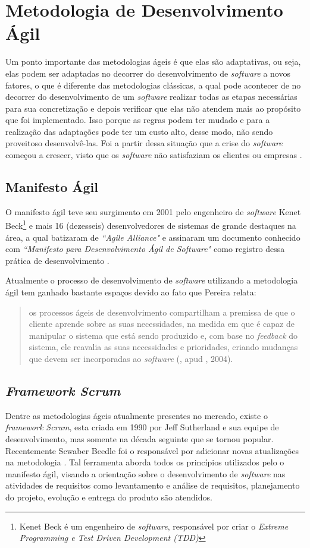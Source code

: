 \section{Metodologia de Desenvolvimento Ágil}
\noindent Um ponto importante das metodologias ágeis é que elas são adaptativas, ou seja, elas podem ser adaptadas no decorrer do desenvolvimento de \textit{software} a novos fatores, o que é diferente das metodologias clássicas, a qual pode acontecer de no decorrer do desenvolvimento de um \textit{software} realizar todas as etapas necessárias para sua concretização e depois verificar que elas não atendem mais ao propósito que foi implementado. Isso porque as regras podem ter mudado e para a realização das adaptações pode ter um custo alto, desse modo, não sendo proveitoso desenvolvê-las. Foi a partir dessa situação que a crise do \textit{software} começou a crescer, visto que os \textit{software} não satisfaziam os clientes ou empresas \cite{2005:rezende}.

\subsection{Manifesto Ágil}
\noindent O manifesto ágil teve seu surgimento em 2001 pelo engenheiro de \textit{software} Kenet Beck\footnote[5]{Kenet Beck é um engenheiro de \textit{software}, responsável por criar o \textit{Extreme Programming e Test Driven Development (TDD)}} e mais 16 (dezesseis) desenvolvedores de sistemas de grande destaques na área, a qual batizaram de \textit{``Agile Alliance"} e assinaram um documento conhecido com \textit{``Manifesto para Desenvolvimento Ágil de \textit{Software}"} como registro dessa prática de desenvolvimento \cite{2001:Pressman}.

Atualmente o processo de desenvolvimento de \textit{software} utilizando a metodologia ágil tem ganhado bastante espaços devido ao fato que Pereira \cite{2013:Pereira} relata:
\begin{quote}
    os processos ágeis de desenvolvimento compartilham a premissa de que o cliente aprende sobre as suas necessidades, na medida em que é capaz de manipular o sistema que está sendo produzido e, com base no \textit{feedback} do sistema, ele reavalia as suas necessidades e prioridades, criando mudanças que devem ser incorporadas ao \textit{software} (\cite{2013:Pereira}, apud \cite{2004:Teles}, 2004). 
\end{quote}

\subsection{\textit{Framework Scrum}}
\noindent Dentre as metodologias ágeis atualmente presentes no mercado, existe o \textit{ framework Scrum}, esta criada em 1990 por Jeff Sutherland e sua equipe de desenvolvimento, mas somente na década seguinte que se tornou popular. Recentemente Scwaber Beedle foi o responsável por adicionar novas atualizações na metodologia \cite{2001:Pressman}. Tal ferramenta aborda todos os princípios utilizados pelo o manifesto ágil, visando a orientação sobre o desenvolvimento de \textit{software} nas atividades de requisitos como levantamento e análise de requisitos, planejamento do projeto, evolução e entrega do produto são atendidos.

